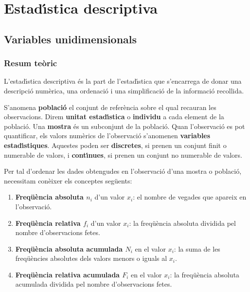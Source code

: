 \part{Estad\'{\i}stica descriptiva
}

\chapter{Variables unidimensionals}

\section{Resum te\`oric}

L'estad\'{\i}stica descriptiva \'es la part de l'estad\'{\i}stica que 
s'encarrega de donar una descripci\'o num\`erica, 
una ordenaci\'o 
i una simplificaci\'o de la informaci\'o recollida.

S'anomena {\bf poblaci\'o} 
el conjunt de refer\`encia sobre el qual recauran les
observacions. 
Direm {\bf unitat estad\'{\i}stica} 
o {\bf individu} a cada element de
la poblaci\'o. Una {\bf mostra} 
\'es un subconjunt de la poblaci\'o. Quan
l'observaci\'o es pot quantificar, els valors num\`erics de l'observaci\'o
s'anomenen {\bf variables estad\'{\i}stiques}.
Aquestes poden ser {\bf discretes},
si prenen un conjunt finit o numerable de valors, i {\bf cont\'{\i}nues},
 si prenen
un conjunt no numerable de valors.


Per tal d'ordenar les dades obtengudes en l'observaci\'o d'una mostra 
o poblaci\'o, necessitam con\`eixer els conceptes seg\"uents:

\begin{enumerate}

\item {\bf Freq\"u\`encia absoluta $n_i$} 
d'un valor $x_i$: el nombre de vegades
que apareix en l'observaci\'o.

\item {\bf Freq\"u\`encia relativa $f_i$} 
d'un valor $x_i$: 
la freq\"u\`encia absoluta
dividida pel nombre d'observacions fetes.

\item {\bf Freq\"u\`encia absoluta acumulada $N_i$} 
en el valor $x_i$: la suma de
les freq\"u\`encies absolutes dels valors menors o iguals al $x_i$.

\item {\bf Freq\"u\`encia relativa acumulada $F_i$} 
en el valor $x_i$: la
freq\"u\`encia absoluta acumulada dividida pel nombre d'observacions fetes.

\end{enumerate}

